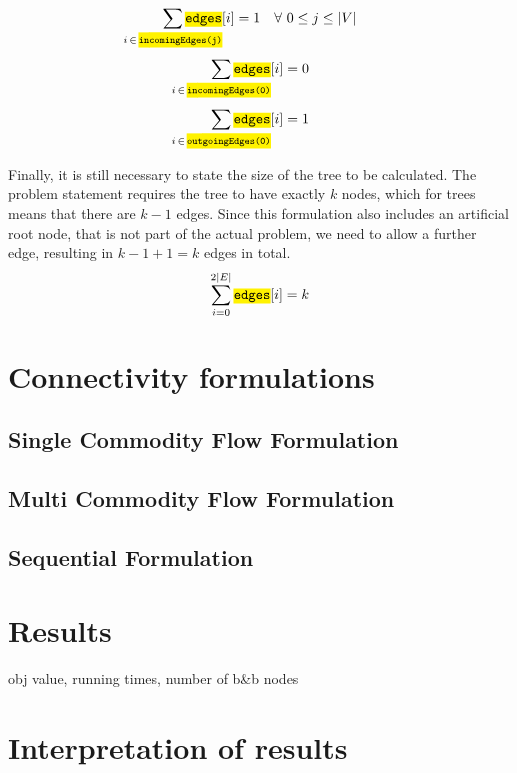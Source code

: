 \documentclass[,%
			paper=a4,%
			DIV12,
			liststotoc,
			bibtotoc,
			draft=false,%
			numbers=noendperiod
			]{scrartcl}
\newcommand{\ilc}[1]{\hl{\texttt{#1}}} %
\begin{document}
\begin{equation}\label{eq:oneIncoming}
	\sum_{\mathclap{i\,\in\,\ilc{incomingEdges(j)}}} \ilc{edges}[i] = 1 \quad \forall~0\leq j \leq |V|
\end{equation}
\begin{equation}\label{eq:root0}
	\sum_{\mathclap{i\,\in\,\ilc{incomingEdges(0)}}} \ilc{edges}[i] = 0
\end{equation}
\begin{equation}\label{eq:root1}
	\sum_{\mathclap{i\,\in\,\ilc{outgoingEdges(0)}}} \ilc{edges}[i] = 1 
\end{equation}

Finally, it is still necessary to state the size of the tree to be calculated.
The problem statement requires the tree to have exactly $k$ nodes, which for trees means that there are $k-1$ edges.
Since this formulation also includes an artificial root node, that is not part of the actual problem, we need to allow a further edge, resulting in $k-1+1=k$ edges in total.
\begin{equation}
	\sum_{i=0}^{2|E|} \ilc{edges}[i] = k
\end{equation}

\section{Connectivity formulations}

\subsection{Single Commodity Flow Formulation}
\subsection{Multi Commodity Flow Formulation}
\subsection{Sequential Formulation}

\section{Results}
obj value, running times, number of b\&b nodes

\section{Interpretation of results}
\end{document}
